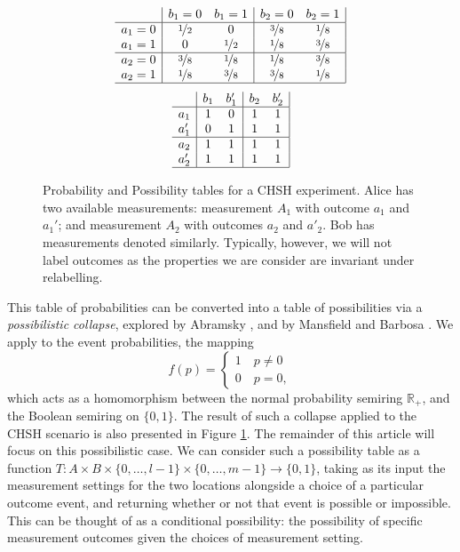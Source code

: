 \documentclass[reprint]{revtex4-1}
\theoremstyle{definition}
\begin{document}
\begin{figure}
\begin{equation*}
\begin{array}{c| c c | c c |}
&b_1=0&b_1=1&b_2=0&b_2=1\\ \hline
a_1=0&\nicefrac{1}{2} &0  & \nicefrac{3}{8} & \nicefrac{1}{8}\\
a_1=1&0&\nicefrac{1}{2}  &\nicefrac{1}{8} &\nicefrac{3}{8} \\ \hline
a_2=0&\nicefrac{3}{8}&\nicefrac{1}{8} &\nicefrac{1}{8} &\nicefrac{3}{8}  \\
a_2=1&\nicefrac{1}{8}&\nicefrac{3}{8} &\nicefrac{3}{8} & \nicefrac{1}{8} \\ \hline
\end{array} \end{equation*}\begin{equation*}
\begin{array}{c| c c | c c |}
&b_1&b_1'&b_2&b'_2\\ \hline
a_1&1 &0  &1 & 1\\
a_1'&0&1  &1 &1\\ \hline
a_2&1&1&1 &1 \\
a_2'&1&1 &1 &1 \\ \hline
\end{array} 
\end{equation*}
\caption{Probability and Possibility tables for a CHSH \cite{CHSH1969} experiment. Alice has two available measurements: measurement $A_1$ with outcome $a_1$ and $a_1'$; and measurement $A_2$ with outcomes $a_2$ and $a'_2$. Bob has measurements denoted similarly. Typically, however, we will not label outcomes as the properties we are consider are invariant under relabelling.}
\label{CHSH}
\end{figure}

This table of probabilities can be converted into a table of possibilities via a \emph{possibilistic collapse}, explored by Abramsky \cite{Abra2013-2}, and by Mansfield and Barbosa \cite{Mans2014}. We apply to the event probabilities, the mapping
\begin{equation}
f(p)=\begin{cases} 1 \quad p\neq 0 \\ 0 \quad p=0, \end{cases}
\end{equation}
which acts as a homomorphism between the normal probability semiring $\mathbb{R}_+$, and the Boolean semiring on $\{0,1\}$. The result of such a collapse applied to the CHSH scenario is also presented in Figure \ref{CHSH}. The remainder of this article will focus on this possibilistic case. We can consider such a possibility table as a function $T:A\times B \times \{0,\dots, l-1\}\times \{0,\dots, m-1\}\rightarrow\{0,1\}$, taking as its input the measurement settings for the two locations alongside a choice of a particular outcome event, and returning whether or not that event is possible or impossible. This can be thought of as a conditional possibility: the possibility of specific measurement outcomes given the choices of measurement setting.
\end{document}
